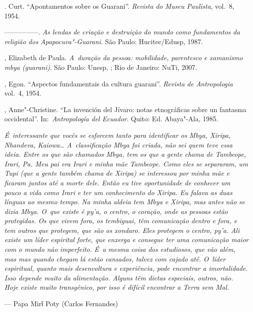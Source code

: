 \begin{Parskip}
. Curt. ``Apontamentos sobre os Guarani''. \emph{Revista do Museu
Paulista}, vol.~8, 1954.

—————. \emph{As lendas de criação e destruição do mundo como fundamentos da
religião dos Apapocuva"-Guarani}. São Paulo: Hucitec/Edusp, 1987.

, Elizabeth de Paula. \emph{A~duração da pessoa: mobilidade,
parentesco e xamanismo mbya (guarani)}. São Paulo: Unesp, ; Rio de
Janeiro: NuTi, 2007.

, Egon. ``Aspectos fundamentais da cultura guarani''. \emph{Revista de
Antropologia} vol.~4, 1954.

, Anne"-Christine. ``La invención del Jívaro: notas etnográficas
sobre un fantasma occidental''. In:~\emph{Antropología del Ecuador}. Quito: Ed.
Abaya"-Ala, 1985.
\end{Parskip}

\clearpage

\vspace*{\fill}

\begin{flushleft}
\begin{minipage}[c]{0.85\textwidth}
\raggedright
\footnotesize
\emph{É~interessante que vocês se esforcem tanto para identificar os Mbya,
Xiripa, Nhandeva, Kaiowa\ldots{} A~classificação Mbya foi criada, não sei
quem teve essa ideia. Entre os que são chamados Mbya, tem os que a
gente chama de \emph{Tambeope, Irari, Pa}. Meu pai era Irari e
minha mãe Tambeope. Como eles se separaram, um Tupi (que a gente também
chama de Xiripa) se interessou por minha mãe e ficaram juntos até a
morte dele. Então eu tive oportunidade de conhecer um pouco a vida como
Irari e ter um conhecimento do Xiripa. Eu falava as duas línguas ao
mesmo tempo. Na minha aldeia tem Mbya e Xiripa, mas antes não se dizia
Mbya. O~que existe é \emph{py’a}, o centro, o coração, onde as pessoas estão
protegidas. Os que vivem fora, os \emph{tembiguai}, têm comunicação dentro e
fora, e tem outros que protegem, que são os \emph{xondaro}. Eles protegem o
centro, \emph{py’a}. Ali existe um líder espirital forte, que enxerga e
consegue ter uma comunicação maior com o mundo não imperfeito. É~a
mesma coisa dos estudiosos, que vão além, mas mas quando chegam lá
estão cansados, talvez com cajado até. O~líder espiritual, quanto mais
desenvoltura e experiência, pode encontrar a imortalidade. Isso depende
muito da alimentação. Alguns têm dietas especiais, outros, não. Hoje
existe muito transgênico, por isso é difícil encontrar a Terra sem Mal.}

\smallskip
\hspace*{\fill}--- Papa Mirῖ Poty (Carlos Fernandes)
\end{minipage}
\end{flushleft}

